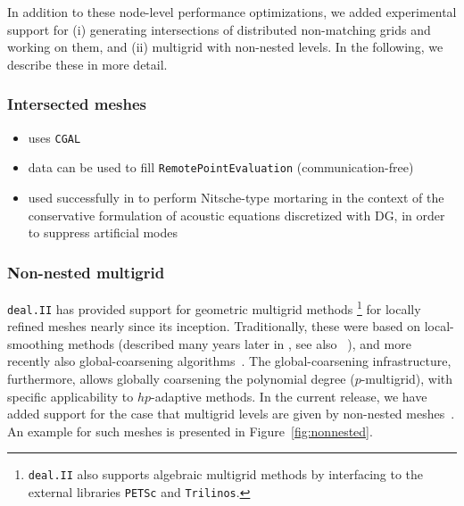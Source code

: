 \documentclass{ansarticle-preprint}
\newcommand{\specialword}[1]{\texttt{#1}}
\newcommand{\dealii}{{\specialword{deal.II}}\xspace}
\begin{document}
In addition to these node-level performance optimizations, we added experimental
support for (i) generating intersections of distributed
non-matching grids and working on them,
and (ii) multigrid with non-nested levels. In the following, we describe these
in more detail.

\subsubsection{Intersected meshes}


\begin{itemize}
\item uses \texttt{CGAL}~\cite{cgal-user-ref}
\item data can be used to fill \texttt{RemotePointEvaluation} (communication-free)
\item used successfully in \cite{heinz2023high} to perform Nitsche-type mortaring in the context
of the conservative formulation of acoustic equations discretized with
DG, in order to suppress artificial modes
\end{itemize}

\subsubsection{Non-nested multigrid}

\dealii has provided support for geometric multigrid methods%
\footnote{\dealii{} also supports algebraic multigrid methods
by interfacing to the external libraries \texttt{PETSc}
and \texttt{Trilinos}.}
for locally refined meshes nearly since its inception.
Traditionally, these were based on local-smoothing
methods (described many years later in \cite{JanssenKanschat2011}, see also
~\cite{ClevengerHeisterKanschatKronbichler2019}), and more
recently also global-coarsening algorithms~\cite{munch2022gc}. The global-coarsening
infrastructure, furthermore, allows globally coarsening the polynomial degree ($p$-multigrid),
with specific applicability to $hp$-adaptive methods.
In the current release, we have added support for the case
that multigrid levels are given by non-nested meshes~\cite{adams2002evaluation, bittencourt2001nonnested, bramble1991analysis}. An example for such meshes is
presented in Figure~\ref{fig:nonnested}.
\end{document}
